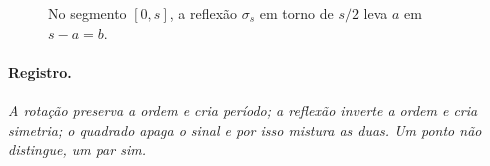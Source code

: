 \documentclass[12pt,a4paper]{article}
\theoremstyle{definition}
\begin{document}
\begin{figure}[htbp]
\centering
{}
\caption{No segmento $[0,s]$, a reflexão $\sigma_s$ em torno de $s/2$ leva $a$ em $s-a=b$.}
\end{figure}

\paragraph{Registro.}
\emph{A rotação preserva a ordem e cria período; a reflexão inverte a ordem e cria simetria; o quadrado apaga o sinal e por isso mistura as duas. Um ponto não distingue, um par sim.}
\end{document}
